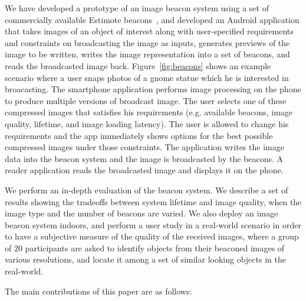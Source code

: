 
We have developed a prototype of an image beacon system using a set of commercially available Estimote beacons~\cite{ESTIMOTE}, and developed an Android application that takes images of an object of interest along with user-specified requirements and constraints on broadcasting the image as inputs, generates previews of the image to be written, writes the image representation into a set of beacons, and reads the broadcasted image back. Figure~\ref{fig:beacons} shows an example scenario where a user snaps photos of a gnome statue which he is interested in broacasting. The smartphone application performs image processing on the phone to produce multiple versions of broadcast image. The user selects one of these compressed images that satisfies his requirements (e.g. available beacons, image quality, lifetime, and image loading latency). The user is allowed to change his requirements and the app immediately shows options for the best possible compressed images under those constraints. The application writes the image data into the beacon system and the image is broadcasted by the beacons. A reader application reads the broadcasted image and displays it on the phone.


We perform an in-depth evaluation of the beacon system. We describe a set of results showing the tradeoffs between system lifetime and image quality, when the image type and the number of beacons are varied. We also deploy an image beacon system indoors, and perform a user study in a real-world scenario in order to have a subjective measure of the quality of the received images, where a group of $20$ participants are asked to identify objects from their beaconed images of various resolutions, and locate it among a set of similar looking objects in the real-world.

The main contributions of this paper are as follows:

